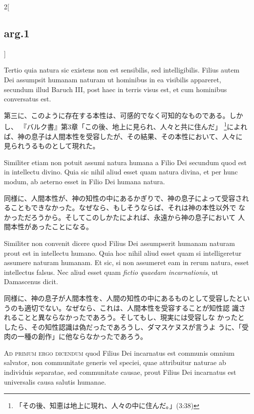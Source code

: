 \documentclass[paper=a4paper,fontsize=10pt,jafontsize=9pt,titlepage]{jlreq}
\begin{document}
\begin{paracol}{2}[\subsection{arg.1}]
\switchcolumn*

Tertio quia natura sic existens non
est sensibilis, sed intelligibilis. Filius autem Dei assumpsit humanam
naturam ut hominibus in ea visibilis appareret, secundum illud Baruch
III, post haec in terris visus est, et cum hominibus conversatus
est.

\switchcolumn

第三に、このように存在する本性は、可感的でなく可知的なものである。しかし、
『バルク書』第3章「この後、地上に見られ、人々と共に住んだ」
 \footnote{「その後、知恵は地上に現れ、人々の中に住んだ。」(3:38)}によれ
 ば、神の息子は人間本性を受容したが、その結果、その本性において、人々に
 見られうるものとして現れた。

\switchcolumn*

Similiter etiam non potuit assumi natura humana a Filio Dei
secundum quod est in intellectu divino. Quia sic nihil aliud esset quam
natura divina, et per hunc modum, ab aeterno esset in Filio Dei humana
natura.

\switchcolumn

同様に、人間本性が、神の知性の中にあるかぎりで、神の息子によって受容され
 ることもできなかった。なぜなら、もしそうならば、それは神の本性以外で
 なかっただろうから。そしてこのしかたによれば、永遠から神の息子において
 人間本性があったことになる。

\switchcolumn*

Similiter non convenit dicere quod Filius Dei assumpserit
humanam naturam prout est in intellectu humano. Quia hoc nihil aliud
esset quam si intelligeretur assumere naturam humanam. Et sic, si non
assumeret eam in rerum natura, esset intellectus falsus. Nec aliud esset
quam {\itshape fictio quaedam incarnationis}, ut Damascenus dicit.

\switchcolumn

同様に、神の息子が人間本性を、人間の知性の中にあるものとして受容したとい
 うのも適切でない。なぜなら、これは、人間本性を受容することが知性認
 識されることと異ならなかったであろう。そしてもし、現実には受容しな
 かったとしたら、その知性認識は偽だったであろうし、ダマスケヌスが言うよ
 うに、「受肉の一種の創作」に他ならなかったであろう。

\switchcolumn*[\subsection{ad.1}]

{\scshape Ad primum ergo dicendum} quod Filius Dei incarnatus est communis omnium
salvator, non communitate generis vel speciei, quae attribuitur naturae
ab individuis separatae, sed communitate causae, prout Filius Dei
incarnatus est universalis causa salutis humanae.


\end{paracol}
\end{document}
